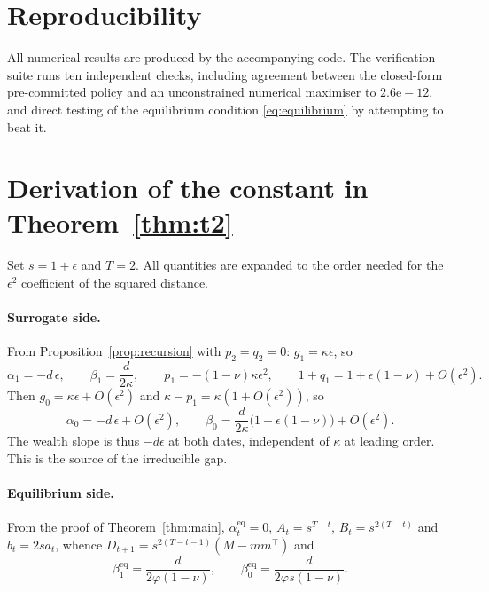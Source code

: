 \documentclass[11pt,a4paper]{article}
\theoremstyle{plain}
\theoremstyle{definition}
\theoremstyle{remark}
\begin{document}
\section*{Reproducibility}

All numerical results are produced by the accompanying code. The verification
suite runs ten independent checks, including agreement between the closed-form
pre-committed policy and an unconstrained numerical maximiser to
$2.6\mathrm{e}{-}12$, and direct testing of the equilibrium condition
\eqref{eq:equilibrium} by attempting to beat it.

\appendix
\section{Derivation of the constant in Theorem~\ref{thm:t2}}\label{app:t2}

Set $s=1+\epsilon$ and $T=2$. All quantities are expanded to the order needed for
the $\epsilon^{2}$ coefficient of the squared distance.

\paragraph{Surrogate side.} From Proposition~\ref{prop:recursion} with
$p_2=q_2=0$: $g_1=\kappa\epsilon$, so
\[
\alpha_1=-d\,\epsilon,\qquad \beta_1=\frac{d}{2\kappa},\qquad
p_1=-(1-\nu)\kappa\epsilon^{2},\qquad
1+q_1=1+\epsilon(1-\nu)+O(\epsilon^{2}).
\]
Then $g_0=\kappa\epsilon+O(\epsilon^{2})$ and $\kappa-p_1=\kappa(1+O(\epsilon^2))$,
so
\[
\alpha_0=-d\,\epsilon+O(\epsilon^{2}),\qquad
\beta_0=\frac{d}{2\kappa}\bigl(1+\epsilon(1-\nu)\bigr)+O(\epsilon^{2}).
\]
The wealth slope is thus $-d\epsilon$ at both dates, independent of $\kappa$ at
leading order. This is the source of the irreducible gap.

\paragraph{Equilibrium side.} From the proof of Theorem~\ref{thm:main},
$\alpha^{\mathrm{eq}}_t=0$, $A_t=s^{T-t}$, $B_t=s^{2(T-t)}$ and $b_t=2sa_t$,
whence $D_{t+1}=s^{2(T-t-1)}(M-mm^{\top})$ and
\[
\beta^{\mathrm{eq}}_1=\frac{d}{2\varphi(1-\nu)},\qquad
\beta^{\mathrm{eq}}_0=\frac{d}{2\varphi s(1-\nu)} .
\]
\end{document}
